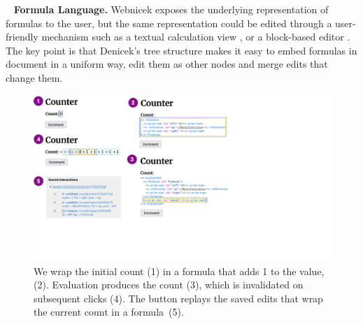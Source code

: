 \documentclass[sigconf,anonymous,screen]{acmart}
\newcommand{\note}[1]{\textcolor{red}{#1}}
\DeclareRobustCommand{\keyideabox}[3]{\begin{tcolorbox}[breakable,
  boxsep=5pt,left=0pt,right=0pt,top=0pt,bottom=0pt,width=\dimexpr\columnwidth\relax,
  colback=gray!20,colframe=gray!20,
  enlarge bottom by=0pt,enlarge top by=0pt,
  arc=0pt,outer arc=0pt]
\lettrine[lraise=0.3]{\LARGE #1}{~}
\small \textbf{#2.} #3
\end{tcolorbox}
}
\begin{document}

\keyideabox{\faSuperscript}{Formula Language}{
Webnicek exposes the underlying representation of formulas to the user, but the same representation
could be edited through a user-friendly mechanism such as a textual calculation view \cite{sarkar-2018-calc},
or a block-based editor \cite{jansen-2019-xlblocks}. The key point
is that Denicek's tree structure makes it easy to embed formulas in document in a uniform
way, edit them as other nodes and merge edits that change them.}


\begin{figure}[t]
\vspace{-0.5em}
\includegraphics[width=0.95\columnwidth,clip,trim=0cm 5cm 11.5cm 0cm]{fig/counter.pdf}
\vspace{-0.5em}
\caption{We wrap the initial count (1) in a formula that adds 1 to the
value, (2). Evaluation produces the count (3), which is invalidated on subsequent clicks (4).
The button replays the saved edits that wrap the current count in a formula~(5).}
\label{fig:counter}
\vspace{-1em}
\end{figure}
\end{document}
